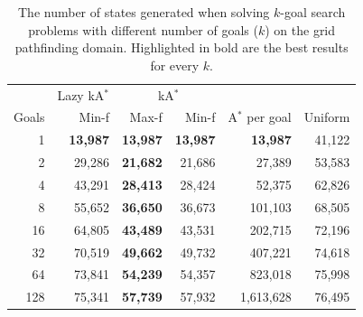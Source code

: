 \documentclass{aicom2e}
\newcommand{\kgs}{$k$-goal search}
\newcommand{\astar}{A$^*$}
\newcommand{\kastar}{kA$^*$}
\newcommand{\minf}{Min-f}
\newcommand{\maxf}{Max-f}
\begin{document}

\begin{table}[]
	\centering
	\begin{tabular}{r|r|rr|r|r}
		& \multicolumn{1}{c|}{Lazy \kastar{}} & \multicolumn{2}{c|}{\kastar{}} &             &         \\
		Goals & Min-f                        & \maxf{}      & \minf{}     & \astar{} per goal & Uniform \\
		\hline
1                         & \textbf{13,987}                      & \textbf{13,987}           & \textbf{13,987}           & \textbf{13,987}                 & 41,122                      \\
2                         & 29,286                               & \textbf{21,682}           & 21,686                    & 27,389                          & 53,583                      \\
4                         & 43,291                               & \textbf{28,413}           & 28,424                    & 52,375                          & 62,826                      \\
8                         & 55,652                               & \textbf{36,650}           & 36,673                    & 101,103                         & 68,505                      \\
16                        & 64,805                               & \textbf{43,489}           & 43,531                    & 202,715                         & 72,196                      \\
32                        & 70,519                               & \textbf{49,662}           & 49,732                    & 407,221                         & 74,618                      \\
64                        & 73,841                               & \textbf{54,239}           & 54,357                    & 823,018                         & 75,998                      \\
128                       & 75,341                               & \textbf{57,739}           & 57,932                    & 1,613,628                       & 76,495               
	\end{tabular}
	\caption{The number of states generated when solving \kgs{} problems with different number of goals ($k$) on the grid pathfinding domain. Highlighted in bold are the best results for every $k$.}
	\label{tab:pathfinding-generated}
\end{table}
\end{document}

